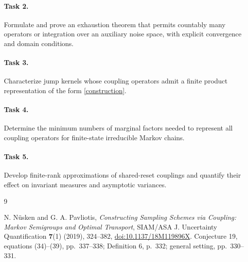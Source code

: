 \documentclass[10pt]{article}
\begin{document}
\paragraph{Task 2.}
Formulate and prove an exhaustion theorem that permits countably many
operators or integration over an auxiliary noise space, with explicit
convergence and domain conditions.

\paragraph{Task 3.}
Characterize jump kernels whose coupling operators admit a finite
product representation of the form \eqref{construction}.

\paragraph{Task 4.}
Determine the minimum numbers of marginal factors needed to represent
all coupling operators for finite-state irreducible Markov chains.

\paragraph{Task 5.}
Develop finite-rank approximations of shared-reset couplings and
quantify their effect on invariant measures and asymptotic variances.

\begin{thebibliography}{9}
\raggedright
{}
N. N\"usken and G. A. Pavliotis,
\emph{Constructing Sampling Schemes via Coupling: Markov Semigroups and
Optimal Transport}, SIAM/ASA J. Uncertainty Quantification
\textbf{7}(1) (2019), 324--382,
\href{https://doi.org/10.1137/18M119896X}{doi:10.1137/18M119896X}.
Conjecture 19, equations (34)--(39), pp.~337--338;
Definition 6, p.~332; general setting, pp.~330--331.
\end{thebibliography}
\end{document}
